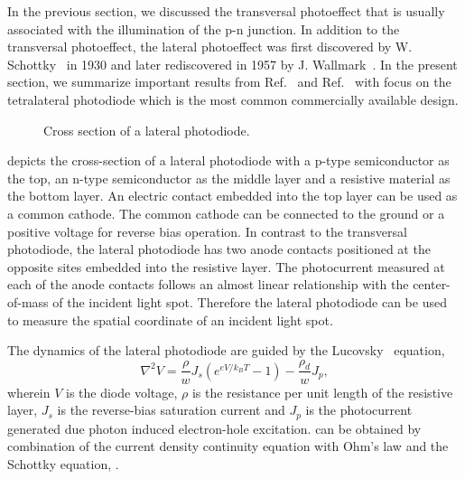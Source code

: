 In the previous section, we discussed the transversal photoeffect that is usually associated with the illumination of the p-n junction.
In addition to the transversal photoeffect, the lateral photoeffect was first discovered by W. Schottky~\cite{Schottky30} in 1930 and later rediscovered in 1957 by J. Wallmark~\cite{Wallmark57}.
In the present section, we summarize important results from Ref.~\cite{Noorlag74} and Ref.~\cite{Woltring75} with focus on the tetralateral photodiode which is the most common commercially available design.
\begin{figure}[H]
	\centering
	
	\caption{Cross section of a lateral photodiode.}\label{fig:lateral_photodiode_cross_section}
\end{figure}
 depicts the cross-section of a lateral photodiode with a p-type semiconductor as the top, an n-type semiconductor as the middle layer and a resistive material as the bottom layer.
An electric contact embedded into the top layer can be used as a common cathode.
The common cathode can be connected to the ground or a positive voltage for reverse bias operation.
In contrast to the transversal photodiode, the lateral photodiode has two anode contacts positioned at the opposite sites embedded into the resistive layer.
The photocurrent measured at each of the anode contacts follows an almost linear relationship with the center-of-mass of the incident light spot.
Therefore the lateral photodiode can be used to measure the spatial coordinate of an incident light spot.

The dynamics of the lateral photodiode are guided by the Lucovsky~\cite{Lucovsky60} equation,
\begin{equation}
	\nabla^2V=\frac{\rho}{w}J_s\left(e^{eV/k_BT}-1\right)-\frac{\rho_d}{w}J_p\label{eq:lucovsky_exact},
\end{equation}
wherein $V$ is the diode voltage, $\rho$ is the resistance per unit length of the resistive layer, $J_s$ is the reverse-bias saturation current and $J_p$ is the photocurrent generated due photon induced electron-hole excitation.
 can be obtained by combination of the current density continuity equation with Ohm's law and the Schottky equation, .

